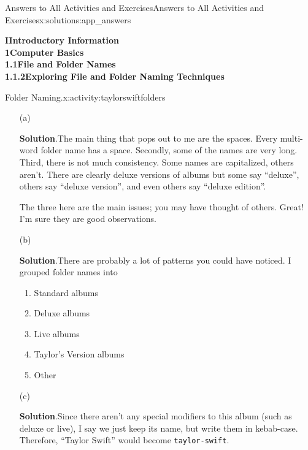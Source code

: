 \documentclass[oneside,10pt,]{book}
\newcommand{\blocktitlefont}{\relax}
\newcommand{\mono}[1]{\texttt{#1}}
\begin{document}
\begin{solutions-chapter}{Answers to All Activities and Exercises}{}{Answers to All Activities and Exercises}{}{}{x:solutions:app_answers}
\par\medskip
\noindent\textbf{\Large{}I\space\textperiodcentered\space{}Introductory Information\\
1\space\textperiodcentered\space{}Computer Basics\\
1.1\space\textperiodcentered\space{}File and Folder Names\\
1.1.2\space\textperiodcentered\space{}Exploring File and Folder Naming Techniques}
\begin{activitysolution}{1.1}{Folder Naming.}{x:activity:taylorswiftfolders}%
\begin{enumerate}[font=\bfseries,label=(\alph*),ref=\alph*]
\item[(a)]\par\smallskip%
\noindent\textbf{\blocktitlefont Solution}.\hypertarget{g:solution:idm481076456-back}{}\quad{}The main thing that pops out to me are the spaces. Every multi-word folder name has a space. Secondly, some of the names are very long. Third, there is not much consistency. Some names are capitalized, others aren't. There are clearly deluxe versions of albums but some say ``deluxe'', others say ``deluxe version'', and even others say ``deluxe edition''.%
\par
The three here are the main issues; you may have thought of others. Great! I'm sure they are good observations.%
\item[(b)]\par\smallskip%
\noindent\textbf{\blocktitlefont Solution}.\hypertarget{g:solution:idm481066600-back}{}\quad{}There are probably a lot of patterns you could have noticed. I grouped folder names into%
\begin{enumerate}[label=\arabic*]
\item{}Standard albums%
\item{}Deluxe albums%
\item{}Live albums%
\item{}Taylor's Version albums%
\item{}Other%
\end{enumerate}
%
\item[(c)]\par\smallskip%
\noindent\textbf{\blocktitlefont Solution}.\hypertarget{g:solution:idm481066984-back}{}\quad{}Since there aren't any special modifiers to this album (such as deluxe or live), I say we just keep its name, but write them in kebab-case. Therefore, ``Taylor Swift'' would become \mono{taylor-swift}.%

\end{enumerate}
\end{activitysolution}
\end{solutions-chapter}
\end{document}
